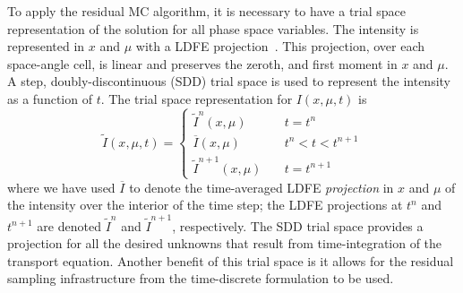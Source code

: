 \documentclass{anstrans}
\begin{document}
To apply the residual MC algorithm, it is necessary to have a trial space representation
of the solution for all phase space variables.  The intensity is represented in $x$ and $\mu$ with a
LDFE projection~\cite{bolding_nse}.  This projection, over each space-angle cell, is linear and preserves the zeroth, and
first moment in $x$ and $\mu$.  A step, doubly-discontinuous (SDD) trial
space is used to represent the intensity as a function of $t$.  The trial space
representation for $I(x,\mu,t)$ is 
\begin{equation}\label{eq:time_space}
    \tilde I(x,\mu,t) = \left \{ \begin{array}{cl}
        \tilde I^{n}(x,\mu)  & \quad t = t^n \\ 
        \overline I(x,\mu)  & \quad t^{n} < t <t^{n+1} \\               
      \tilde I^{n+1}(x,\mu)   &  \quad        t = t^{n+1}
    \end{array}           \right.
\end{equation}
where we have used $\overline I$ to denote the time-averaged LDFE \emph{projection} in $x$
and $\mu$ of the intensity over the interior of the time step;  the LDFE projections at
$t^{n}$ and $t^{n+1}$ are denoted $\tilde I^{n}$ and $\tilde I^{n+1}$, respectively.    
 The SDD trial space provides a
projection for all the desired unknowns that result from time-integration of the transport
equation. Another benefit of this
trial space is it allows for the residual sampling infrastructure from the
time-discrete formulation to be used. 
\end{document}
